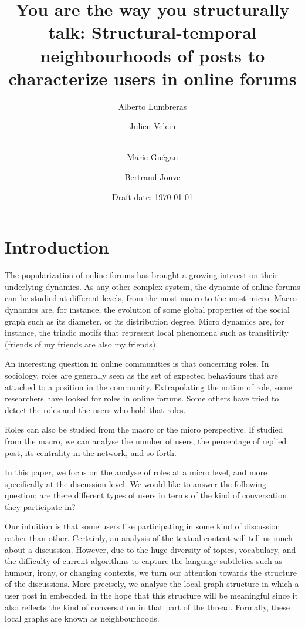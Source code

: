\documentclass[9pt,technote]{IEEEtran}
\begin{document}
\title{You are the way you structurally talk: Structural-temporal neighbourhoods of posts to characterize users in online forums}

\author{Alberto Lumbreras \and
        Julien Velcin  \and\\
        Marie Guégan \and
        Bertrand Jouve
}


\date{Draft date: \today}

\maketitle

\section{Introduction}\label{sec:introduction}

The popularization of online forums has brought a growing interest on their underlying dynamics. As any other complex system, the dynamic of online forums can be studied at different levels, from the most macro to the most micro. Macro dynamics are, for instance, the evolution of some global properties of the social graph such as its diameter, or its distribution degree. Micro dynamics are, for instance, the triadic motifs that represent local phenomena such as transitivity (friends of my friends are also my friends).

An interesting question in online communities is that concerning roles. In sociology, roles are generally seen as the set of expected behaviours that are attached  to a position in the community. Extrapolating the notion of role, some researchers have looked for roles in online forums. Some others have tried to detect the roles and the users who hold that roles.

Roles can also be studied from the macro or the micro perspective. If studied from the macro, we can analyse the number of users, the percentage of replied post, its centrality in the network, and  so forth.

In this paper, we focus on the analyse of roles at a micro level, and more specifically at the discussion level. We would like to answer the following question: are there different types of users in terms of the kind of conversation they participate in?


Our intuition is that some users like participating in some kind of discussion rather than other. Certainly, an analysis of the textual content will tell us much about a discussion. However, due to the huge diversity of topics, vocabulary, and the difficulty of current algorithms to capture the language subtleties such as humour, irony, or changing contexts, we turn our attention towards the structure of the discussions. More precisely, we analyse the local graph structure in which a user post in embedded, in the hope that this structure will be meaningful since it also reflects the kind of conversation in that part of the thread. Formally, these local graphs are known as neighbourhoods.
\end{document}
